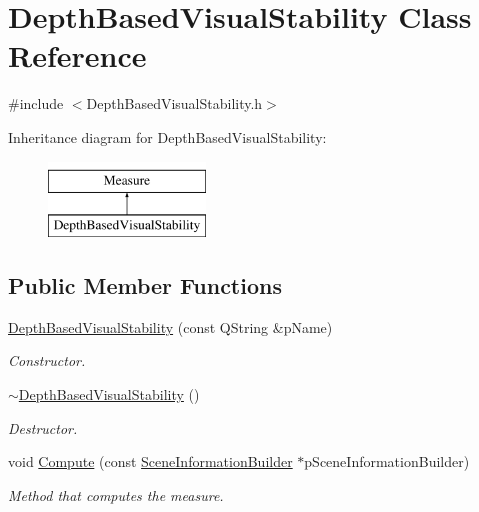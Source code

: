 \hypertarget{class_depth_based_visual_stability}{\section{Depth\+Based\+Visual\+Stability Class Reference}
\label{class_depth_based_visual_stability}
}


{\ttfamily \#include $<$Depth\+Based\+Visual\+Stability.\+h$>$}

Inheritance diagram for Depth\+Based\+Visual\+Stability\+:\begin{figure}[H]
\begin{center}
\leavevmode
\includegraphics[height=2.000000cm]{class_depth_based_visual_stability}
\end{center}
\end{figure}
\subsection*{Public Member Functions}
\begin{DoxyCompactItemize}
\item 
\hyperlink{class_depth_based_visual_stability_a37fe027dc80edb90fd4eeed4d92ca2ff}{Depth\+Based\+Visual\+Stability} (const Q\+String \&p\+Name)
\begin{DoxyCompactList}\small\item\em Constructor. \end{DoxyCompactList}\item 
\hyperlink{class_depth_based_visual_stability_a928ee69e567cd63b0ed653a604141f3d}{$\sim$\+Depth\+Based\+Visual\+Stability} ()
\begin{DoxyCompactList}\small\item\em Destructor. \end{DoxyCompactList}\item 
void \hyperlink{class_depth_based_visual_stability_a077e05aebb89c400716fa8ab12c9731d}{Compute} (const \hyperlink{class_scene_information_builder}{Scene\+Information\+Builder} $\ast$p\+Scene\+Information\+Builder)
\begin{DoxyCompactList}\small\item\em Method that computes the measure. \end{DoxyCompactList}\end{DoxyCompactItemize}
